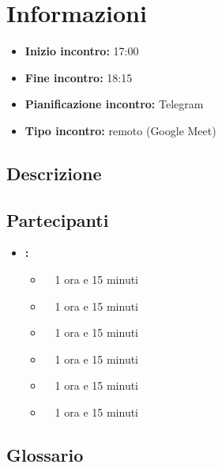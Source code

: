 \section{Informazioni}
\begin{itemize}
	\item \textbf{Inizio incontro:} 17:00
	\item \textbf{Fine incontro:} 18:15
	\item \textbf{Pianificazione incontro:} Telegram
	\item \textbf{Tipo incontro:} remoto (Google Meet)
\end{itemize}

\subsection{Descrizione}
\DocDescription

\subsection{Partecipanti}

\begin{itemize}
	\item \textbf{\GroupName:}
	\begin{itemize}
		\item \tommaso \ \rightarrow\ 1 ora e 15 minuti
		\item \marco \ \rightarrow\ 1 ora e 15 minuti
		\item \riccardo \ \rightarrow\ 1 ora e 15 minuti
		\item \raul \ \rightarrow\ 1 ora e 15 minuti
		\item \martina \ \rightarrow\ 1 ora e 15 minuti
		\item \sebastiano \ \rightarrow\ 1 ora e 15 minuti
	\end{itemize}
\end{itemize}

\subsection{Glossario}
\GlossarioIntroduzione

\clearpage
